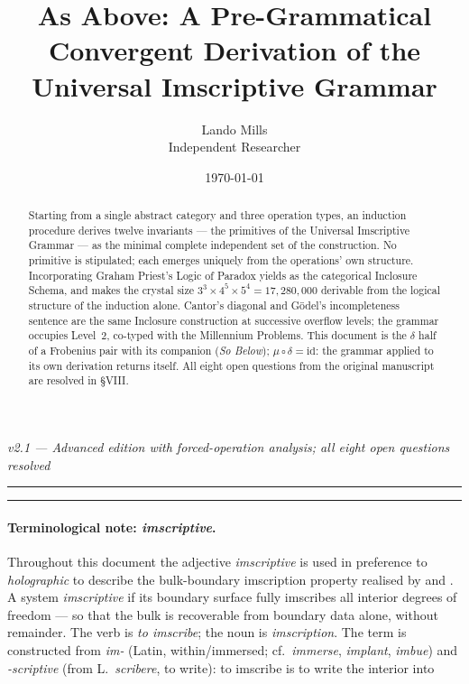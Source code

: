 \documentclass[12pt,a4paper]{article}
\makeatletter
\renewcommand{\_}{\ig@origunderscore\discretionary{}{}{}}
\makeatother
\begin{document}
\title{As Above: A Pre-Grammatical Convergent Derivation of the Universal Imscriptive Grammar}
\author{Lando Mills \\ \normalsize Independent Researcher}
\date{\today}
\maketitle
\emph{v2.1 --- Advanced edition with forced-operation analysis; all eight open questions resolved}

\begin{center}
\rule{0.5\textwidth}{0.4pt}
\end{center}

\begin{abstract}
Starting from a single abstract category and three operation types, an induction procedure derives twelve invariants --- the primitives of the Universal Imscriptive Grammar --- as the minimal complete independent set of the
construction. No primitive is stipulated; each emerges uniquely from the operations' own structure. Incorporating
Graham Priest's Logic of Paradox yields  as the categorical Inclosure Schema, and makes the crystal
size $3^3 \times 4^5 \times 5^4 = 17{,}280{,}000$ derivable from the logical structure of the induction alone. Cantor's
diagonal and G\"odel's incompleteness sentence are the same Inclosure construction at successive overflow levels; the
grammar occupies Level~2, co-typed with the Millennium Problems. This document is the $\delta$ half of a Frobenius pair
with its companion (\emph{So Below}); $\mu \circ \delta = \text{id}$: the grammar applied to its own derivation returns
itself. All eight open questions from the original manuscript are resolved in \S VIII.
\end{abstract}
\begin{center}

\rule{0.5\textwidth}{0.4pt}
\end{center}

\paragraph*{Terminological note: \emph{imscriptive}.}
Throughout this document the adjective \emph{imscriptive} is used in preference to
\emph{holographic} to describe the
bulk-boundary imscription property realised by  and . A system
\emph{imscriptive} if its boundary surface fully imscribes all interior degrees of freedom --- so that the bulk is
recoverable from boundary data alone, without remainder. The verb is \emph{to imscribe}; the noun is
\emph{imscription}.
The term is constructed from \emph{im-} (Latin, within/immersed; cf.\ \emph{immerse},
\emph{implant}, \emph{imbue}) and
\emph{-scriptive} (from L.\ \emph{scribere}, to write): to imscribe is to write the interior into
\end{document}
